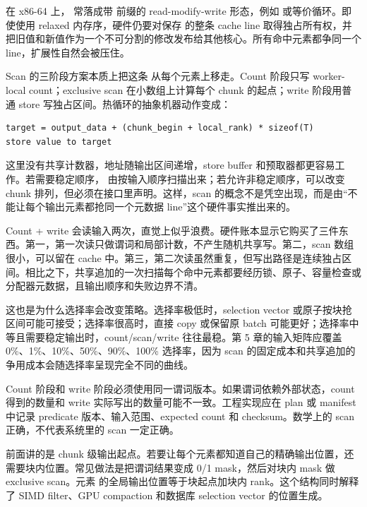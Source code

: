 在 x86-64 上， 常落成带  前缀的 read-modify-write 形态，例如  或等价循环。即使使用 relaxed 内存序，硬件仍要对保存  的整条 cache line 取得独占所有权，并把旧值和新值作为一个不可分割的修改发布给其他核心。所有命中元素都争同一个 line，扩展性自然会被压住。

Scan 的三阶段方案本质上把这条  从每个元素上移走。Count 阶段只写 worker-local count；exclusive scan 在小数组上计算每个 chunk 的起点；write 阶段用普通 store 写独占区间。热循环的抽象机器动作变成：

\begin{lstlisting}[numbers=none,caption={scan 后写出阶段的抽象机器动作}]
target = output_data + (chunk_begin + local_rank) * sizeof(T)
store value to target
\end{lstlisting}

这里没有共享计数器，地址随输出区间递增，store buffer 和预取器都更容易工作。若需要稳定顺序， 由按输入顺序扫描出来；若允许非稳定顺序，可以改变 chunk 排列，但必须在接口里声明。这样，scan 的概念不是凭空出现，而是由“不能让每个输出元素都抢同一个元数据 line”这个硬件事实推出来的。

Count + write 会读输入两次，直觉上似乎浪费。硬件账本显示它购买了三件东西。第一，第一次读只做谓词和局部计数，不产生随机共享写。第二，scan 数组很小，可以留在 cache 中。第三，第二次读虽然重复，但写出路径是连续独占区间。相比之下，共享追加的一次扫描每个命中元素都要经历锁、原子、容量检查或分配器元数据，且输出顺序和失败边界不清。

这也是为什么选择率会改变策略。选择率极低时，selection vector 或原子按块抢区间可能可接受；选择率很高时，直接 copy 或保留原 batch 可能更好；选择率中等且需要稳定输出时，count/scan/write 往往最稳。第 5 章的输入矩阵应覆盖 0\%、1\%、10\%、50\%、90\%、100\% 选择率，因为 scan 的固定成本和共享追加的争用成本会随选择率呈现完全不同的曲线。

Count 阶段和 write 阶段必须使用同一谓词版本。如果谓词依赖外部状态，count 得到的数量和 write 实际写出的数量可能不一致。工程实现应在 plan 或 manifest 中记录 predicate 版本、输入范围、expected count 和 checksum。数学上的 scan 正确，不代表系统里的 scan 一定正确。

前面讲的是 chunk 级输出起点。若要让每个元素都知道自己的精确输出位置，还需要块内位置。常见做法是把谓词结果变成 0/1 mask，然后对块内 mask 做 exclusive scan。元素  的全局输出位置等于块起点加块内 rank。这个结构同时解释了 SIMD filter、GPU compaction 和数据库 selection vector 的位置生成。

